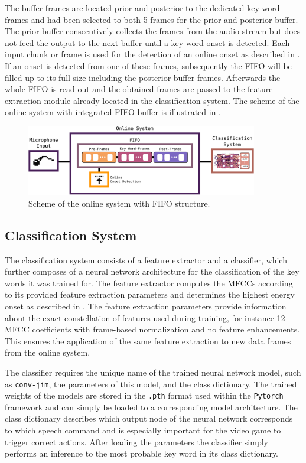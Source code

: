 The buffer frames are located prior and posterior to the dedicated key word frames and had been selected to both 5 frames for the prior and posterior buffer.
The prior buffer consecutively collects the frames from the audio stream but does not feed the output to the next buffer until a key word onset is detected. 
Each input chunk or frame is used for the detection of an online onset as described in .
If an onset is detected from one of these frames, subsequently the FIFO will be filled up to its full size including the posterior buffer frames.
Afterwards the whole FIFO is read out and the obtained frames are passed to the feature extraction module already located in the classification system.
The scheme of the online system with integrated FIFO buffer is illustrated in .
\begin{figure}[!ht]
  \centering
  \includegraphics[width=0.9\textwidth]{./6_game/figs/game_system_online.pdf}
  \caption{Scheme of the online system with FIFO structure.}
  \label{fig:game_system_online}
\end{figure}
\FloatBarrier
\noindent



\subsection{Classification System}
The classification system consists of a feature extractor and a classifier, which further composes of a neural network architecture for the classification of the key words it was trained for.
The feature extractor computes the MFCCs according to its provided feature extraction parameters and determines the highest energy onset as described in .
The feature extraction parameters provide information about the exact constellation of features used during training, for instance 12 MFCC coefficients with frame-based normalization and no feature enhancements.
This ensures the application of the same feature extraction to new data frames from the online system.

The classifier requires the unique name of the trained neural network model, such as \texttt{conv-jim}, the parameters of this model, and the class dictionary.
The trained weights of the  models are stored in the \texttt{.pth} format used within the \texttt{Pytorch} framework and can simply be loaded to a corresponding model architecture.
The class dictionary describes which output node of the neural network corresponds to which speech command and is especially important for the video game to trigger correct actions.
After loading the parameters the classifier simply performs an inference to the most probable key word in its class dictionary.

